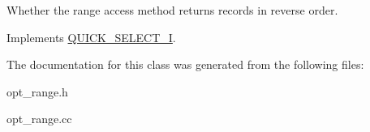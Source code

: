 Whether the range access method returns records in reverse order. 

Implements \mbox{\hyperlink{classQUICK__SELECT__I_a686e8770fe10ac41bafdcf6d0c74dff3}{Q\+U\+I\+C\+K\+\_\+\+S\+E\+L\+E\+C\+T\+\_\+I}}.



The documentation for this class was generated from the following files\+:\begin{DoxyCompactItemize}
\item 
opt\+\_\+range.\+h\item 
opt\+\_\+range.\+cc\end{DoxyCompactItemize}
